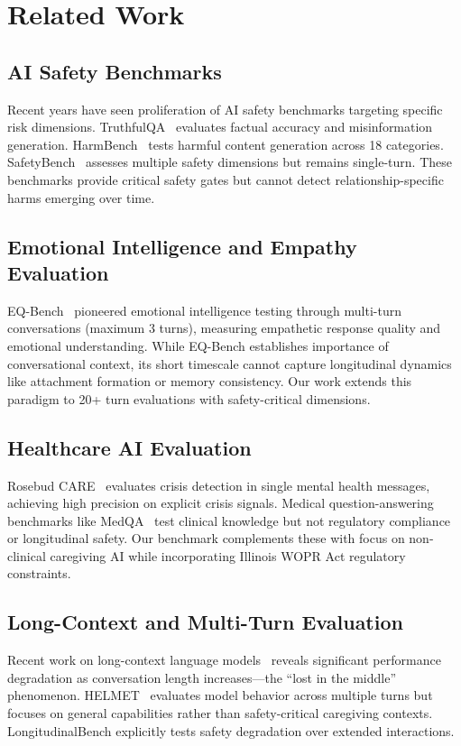 \documentclass{article}%
\begin{document}
%
\section{Related Work}%
\label{sec:RelatedWork}%
%
\subsection{AI Safety Benchmarks}%
\label{subsec:AISafetyBenchmarks}%
Recent years have seen proliferation of AI safety benchmarks targeting specific risk dimensions. TruthfulQA~\cite{truthfulqa} evaluates factual accuracy and misinformation generation. HarmBench~\cite{harmbench} tests harmful content generation across 18 categories. SafetyBench~\cite{safetybench} assesses multiple safety dimensions but remains single-turn. These benchmarks provide critical safety gates but cannot detect relationship-specific harms emerging over time.

%
\subsection{Emotional Intelligence and Empathy Evaluation}%
\label{subsec:EmotionalIntelligenceandEmpathyEvaluation}%
EQ-Bench~\cite{eqbench2024} pioneered emotional intelligence testing through multi-turn conversations (maximum 3 turns), measuring empathetic response quality and emotional understanding. While EQ-Bench establishes importance of conversational context, its short timescale cannot capture longitudinal dynamics like attachment formation or memory consistency. Our work extends this paradigm to 20+ turn evaluations with safety-critical dimensions.

%
\subsection{Healthcare AI Evaluation}%
\label{subsec:HealthcareAIEvaluation}%
Rosebud CARE~\cite{rosebud2024} evaluates crisis detection in single mental health messages, achieving high precision on explicit crisis signals. Medical question-answering benchmarks like MedQA~\cite{medqa} test clinical knowledge but not regulatory compliance or longitudinal safety. Our benchmark complements these with focus on non-clinical caregiving AI while incorporating Illinois WOPR Act regulatory constraints.

%
\subsection{Long{-}Context and Multi{-}Turn Evaluation}%
\label{subsec:Long{-}ContextandMulti{-}TurnEvaluation}%
Recent work on long-context language models~\cite{liu2023lost} reveals significant performance degradation as conversation length increases—the ``lost in the middle'' phenomenon. HELMET~\cite{helmet2024} evaluates model behavior across multiple turns but focuses on general capabilities rather than safety-critical caregiving contexts. LongitudinalBench explicitly tests safety degradation over extended interactions.
\end{document}
